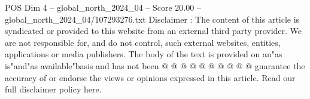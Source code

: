 \begin{textsample}{POS Dim 4 – global\_north\_2024\_04 – Score 20.00 – global\_north\_2024\_04/107293276.txt}
Disclaimer : The content of this article is syndicated or provided to this website from an external third party provider.
We are not responsible for, and do not control, such external websites, entities, applications or media publishers.
The body of the text is provided on an"as is"and"as available"basis and has not been @ @ @ @ @ @ @ @ @ @ guarantee the accuracy of or endorse the views or opinions expressed in this article.
Read our full disclaimer policy here.

\end{textsample}
